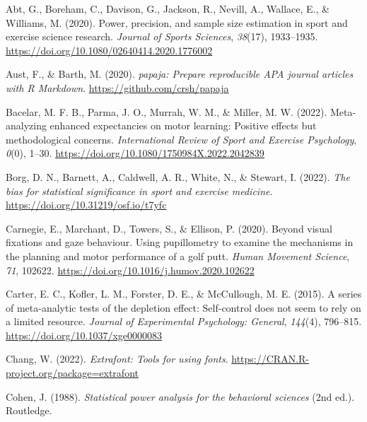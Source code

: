 \documentclass[
  man, donotrepeattitle,mask,floatsintext]{apa7}
\newlength{\cslhangindent}
\newlength{\cslentryspacingunit} %
\newenvironment{CSLReferences}[2] %
 {%
  \setlength{\parindent}{0pt}
  \ifodd #1
  \let\oldpar\par
  \def\par{\hangindent=\cslhangindent\oldpar}
  \fi
  \setlength{\parskip}{#2\cslentryspacingunit}
 }%
 {}
\begin{document}
\hypertarget{refs}{}
\begin{CSLReferences}{1}{0}
\leavevmode{}%
Abt, G., Boreham, C., Davison, G., Jackson, R., Nevill, A., Wallace, E., \& Williams, M. (2020). Power, precision, and sample size estimation in sport and exercise science research. \emph{Journal of Sports Sciences}, \emph{38}(17), 1933--1935. \url{https://doi.org/10.1080/02640414.2020.1776002}

\leavevmode{}%
Aust, F., \& Barth, M. (2020). \emph{{papaja}: {Prepare} reproducible {APA} journal articles with {R Markdown}}. \url{https://github.com/crsh/papaja}

\leavevmode{}%
Bacelar, M. F. B., Parma, J. O., Murrah, W. M., \& Miller, M. W. (2022). Meta-analyzing enhanced expectancies on motor learning: Positive effects but methodological concerns. \emph{International Review of Sport and Exercise Psychology}, \emph{0}(0), 1--30. \url{https://doi.org/10.1080/1750984X.2022.2042839}

\leavevmode{}%
Borg, D. N., Barnett, A., Caldwell, A. R., White, N., \& Stewart, I. (2022). \emph{The bias for statistical significance in sport and exercise medicine}. \url{https://doi.org/10.31219/osf.io/t7yfc}

\leavevmode{}%
Carnegie, E., Marchant, D., Towers, S., \& Ellison, P. (2020). Beyond visual fixations and gaze behaviour. Using pupillometry to examine the mechanisms in the planning and motor performance of a golf putt. \emph{Human Movement Science}, \emph{71}, 102622. \url{https://doi.org/10.1016/j.humov.2020.102622}

\leavevmode{}%
Carter, E. C., Kofler, L. M., Forster, D. E., \& McCullough, M. E. (2015). A series of meta-analytic tests of the depletion effect: Self-control does not seem to rely on a limited resource. \emph{Journal of Experimental Psychology: General}, \emph{144}(4), 796--815. \url{https://doi.org/10.1037/xge0000083}

\leavevmode{}%
Chang, W. (2022). \emph{Extrafont: Tools for using fonts}. \url{https://CRAN.R-project.org/package=extrafont}

\leavevmode{}%
Cohen, J. (1988). \emph{Statistical power analysis for the behavioral sciences} (2nd ed.). Routledge.


\end{CSLReferences}
\end{document}
